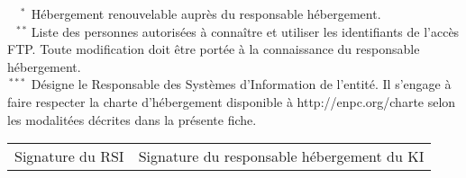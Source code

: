 \documentclass{ki019}
\begin{document}
\vspace{-0.5cm}
\noindent
$^{\phantom{**}*}$ Hébergement renouvelable auprès du responsable hébergement.\\
$^{\phantom{*}**}$ Liste des personnes autorisées à connaître et utiliser les identifiants de l'accès FTP. Toute modification 					doit être portée à la connaissance du responsable hébergement.\\
$^{\phantom{}***}$ Désigne le Responsable des Systèmes d'Information de l'entité. Il s'engage à faire respecter la charte 					d'hébergement disponible à http://enpc.org/charte selon les modalitées décrites dans la présente fiche.

\vspace{0.5cm}
\Large
\begin{tabular}{p{6cm}p{9.5cm}}
Signature du RSI & Signature du responsable hébergement du KI
\end{tabular}

\Footer{\today}
\end{document}
